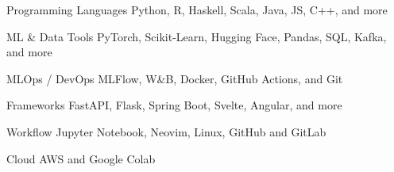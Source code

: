 

\begin{cvskills}

\cvskill
  {Programming Languages}
  {Python, R, Haskell, Scala, Java, JS, C++, and more}

\cvskill
  {ML \& Data Tools}
  {PyTorch, Scikit-Learn, Hugging Face, Pandas, SQL, Kafka, and more}

\cvskill
  {MLOps / DevOps} {MLFlow, W\&B, Docker, GitHub Actions, and Git}

\cvskill
  {Frameworks}
  {FastAPI, Flask, Spring Boot, Svelte, Angular, and more}


\cvskill
  {Workflow}
  {Jupyter Notebook, Neovim, Linux, GitHub and GitLab}

\cvskill
  {Cloud}
  {AWS and Google Colab}

\end{cvskills}
